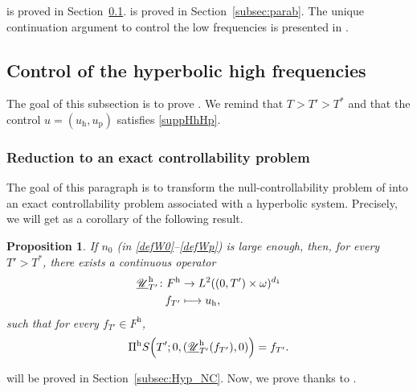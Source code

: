\documentclass[JEP,XML,SOM,Unicode,NoEqCountersInSection]{cedram}
\let\mathcal\mathscr
\def\mto{\mathchoice{\longmapsto}{\mapsto}{\mapsto}{\mapsto}}
\theoremstyle{plain}
\newtheorem{prop}[theorem]{Proposition}
\theoremstyle{definition}
\theoremstyle{remark}
\newcommand{\h}{{\mathrm h}}
\newcommand{\p}{{\mathrm p}}
\let\originalleft\left
\let\originalright\right
\renewcommand{\left}{\mathopen{}\mathclose\bgroup\originalleft}
\renewcommand{\right}{\aftergroup\egroup\originalright}
\begin{document}
 is proved in Section~\ref{subsec:hyp}.
 is proved in Section~\ref{subsec:parab}.
The unique continuation argument to control the low frequencies is presented in .

\subsection{Control of the hyperbolic high frequencies} \label{subsec:hyp}
The goal of this subsection is to prove . We remind that $T > T' >T^\ast$ and that the control $u = (u_\h,u_\p)$ satisfies \eqref{suppHhHp}.

\subsubsection{Reduction to an exact controllability problem}
\label{SecReduceHyp}

The goal of this paragraph is to transform the null-controllability problem of  into an exact controllability problem associated with a hyperbolic system. Precisely, we will get  as a corollary of the following result.

\begin{prop} \label{LemHyp_BIS}
If $n_0$ (in \eqref{defW0}--\eqref{defWp}) is large enough, then, for every ${T'}>T^*$, there exists a continuous operator
\begin{align*}
\underline{\mathcal U}_{T'}^\h \colon
F^{\h} & \to L^2((0,T')\times\omega)^{d_1}\\
f_{T'} &\mto u_{\h},
\end{align*}
such that for every $f_{T'} \in F^{\h}$,
\begin{equation*}
\Pi^{\h} S \left({T'}; 0, (\underline{\mathcal U}_{T'}^\h(f_{T'}),0) \right) = f_{T'}.
\end{equation*}
\end{prop}

 will be proved in Section~\ref{subsec:Hyp_NC}. Now, we prove  thanks to .
\end{document}
